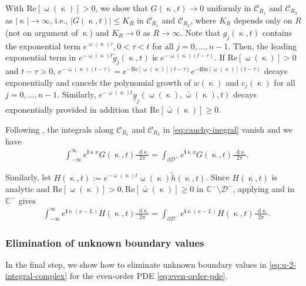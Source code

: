 \documentclass[journal,twoside,web]{ieeecolor}
\newcommand{\CC}{\mathbb{C}}
\newcommand{\D}{\mathcal{D}}
\newcommand{\C}{\mathcal{C}}
\newcommand{\im}{\mathbf{i}}
\newcommand*\diff{\mathop{}\!\mathrm{d}}
\newcommand{\wcomplex}{\upomega}
\newcommand{\kcomplex}{\upkappa}
\begin{document}
With $\text{Re}[\wcomplex(\kcomplex)]>0$, we show that $G(\kcomplex,t)\to0$ uniformly in $\C_{R_1}$ and $\C_{R_2}$ as $|\kcomplex|\to\infty$, i.e., $|G(\kcomplex,t)|\leq K_R$ in $\C_{R_1}$ and $\C_{R_2}$, where $K_R$ depends only on $R$ (not on argument of $\kcomplex$) and $K_R\to0$ as $R\to\infty$.
Note that ${g}_j(\kcomplex,t)$ contains the exponential term $e^{\wcomplex(\kcomplex)\tau}, 0<\tau<t$ for all $j=0,\ldots,n-1$. 
	Then, the leading exponential term in $e^{-\wcomplex(\kcomplex)t}\tilde{g}_j(\kcomplex,t)$ is $e^{-\wcomplex(\kcomplex)(t-\tau)}$.
	If $\text{Re}[\wcomplex(\kcomplex)]>0$ and $t-\tau>0$, $e^{-\wcomplex(\kcomplex)(t-\tau)}=e^{-\text{Re}[\wcomplex(\kcomplex)](t-\tau)}e^{-\im\text{Im}[\wcomplex(\kcomplex)](t-\tau)}$ decays exponentially and cancels the polynomial growth of $w(\kcomplex)$ and $c_j(\kcomplex)$ for all $j=0,\ldots,n-1$. 
	Similarly, $e^{-\wcomplex(\kcomplex)t}\underline{g}_j(\wcomplex(\kcomplex),\bar{\wcomplex}(\kcomplex),t)$ decays exponentially provided in addition that $\text{Re}[\bar{\wcomplex}(\kcomplex)]\geq0$.

Following , the integrals along $\mathcal{C}_{R_1}$ and $\mathcal{C}_{R_2}$ in \eqref{eq:cauchy-inegral} vanish and we have
\begin{equation*}
	\begin{aligned}
		&\int_{-\infty}^{\infty}e^{\im \kcomplex x}G(\kcomplex,t)\frac{\diff \kcomplex}{2\pi} = \int_{\partial\D^+}e^{\im \kcomplex x}G(\kcomplex,t)\frac{\diff \kcomplex}{2\pi}.
	\end{aligned}
\end{equation*}

Similarly, let $H(\kcomplex,t):=e^{-\wcomplex(\kcomplex)t}\wcomplex(\kcomplex)\tilde{h}(\kcomplex,t)$. 
Since $H(\kcomplex,t)$ is analytic and $\text{Re}[\wcomplex(\kcomplex)]>0,\text{Re}[\bar{\wcomplex}(\kcomplex)]\geq0$ in $\CC^-\setminus\D^-$, applying  and  in $\CC^-$ gives
\begin{equation*}
	\begin{aligned}
		&\int_{-\infty}^{\infty}e^{\im \kcomplex(x-L)}H(\kcomplex,t)\frac{\diff \kcomplex}{2\pi} = \int_{\partial\D^-}e^{\im \kcomplex(x-L)}H(\kcomplex,t)\frac{\diff \kcomplex}{2\pi}.
	\end{aligned}
\end{equation*}

\subsubsection{Elimination of unknown boundary values}
\label{sec:general-procedures-elimination}
In the final step, we show how to eliminate unknown boundary values in \eqref{eq:u-2-integral-complex} for the even-order PDE \eqref{eq:even-order-pde}.
\end{document}
